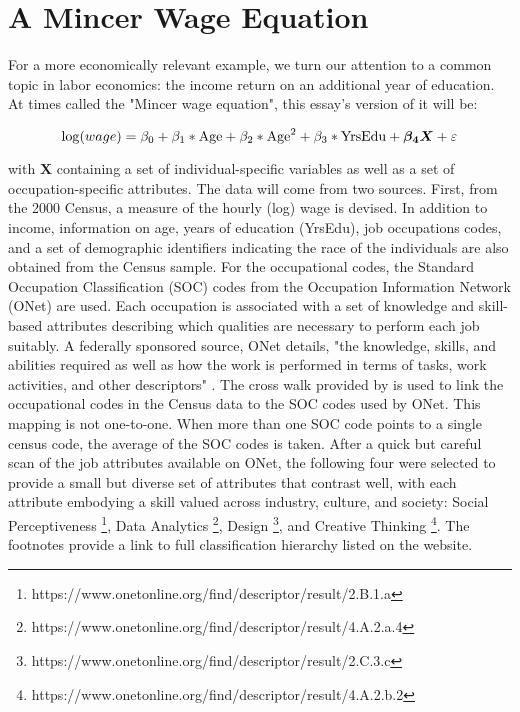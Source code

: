 \documentclass[12pt]{article}
\theoremstyle{definition}
\begin{document}
\clearpage


\section{A Mincer Wage Equation} \label{sec:MincerWageEx}

For a more economically relevant example, we turn our attention to a common topic in labor economics: the income return on an additional year of education. At times called the "Mincer wage equation", this essay's version of it will be:

\begin{equation} \label{eq:mincer_equ}
  \log (wage) = \beta_{0} + \beta_{1} * \textnormal{Age} + \beta_{2} * \textnormal{Age}^{2} + \beta_{3} * \textnormal{YrsEdu} + \boldsymbol{\beta_{4}}\boldsymbol{X} + \varepsilon
\end{equation}

with $\boldsymbol{X}$ containing a set of individual-specific variables as well as a set of occupation-specific attributes. The data will come from two sources. First, from the 2000 Census, a measure of the hourly (log) wage is devised. In addition to income, information on age, years of education (YrsEdu), job occupations codes, and a set of demographic identifiers indicating the race of the individuals are also obtained from the Census sample. For the occupational codes, the Standard Occupation Classification (SOC) codes from the Occupation Information Network (ONet) are used. Each occupation is associated with a set of knowledge and skill-based attributes describing which qualities are necessary to perform each job suitably. A federally sponsored source, ONet details, "the knowledge, skills, and abilities required as well as how the work is performed in terms of tasks, work activities, and other descriptors" \citep{ONET}. The cross walk provided by \citet{Crosswalk} is used to link the occupational codes in the Census data to the SOC codes used by ONet. This mapping is not one-to-one. When more than one SOC code points to a single census code, the average of the SOC codes is taken. After a quick but careful scan of the job attributes available on ONet, the following four were selected to provide a small but diverse set of attributes that contrast well, with each attribute embodying a skill valued across industry, culture, and society: Social Perceptiveness \footnote{https://www.onetonline.org/find/descriptor/result/2.B.1.a}, Data Analytics \footnote{https://www.onetonline.org/find/descriptor/result/4.A.2.a.4}, Design \footnote{https://www.onetonline.org/find/descriptor/result/2.C.3.c}, and Creative Thinking \footnote{https://www.onetonline.org/find/descriptor/result/4.A.2.b.2}. The footnotes provide a link to  full classification hierarchy listed on the website. 
\end{document}
